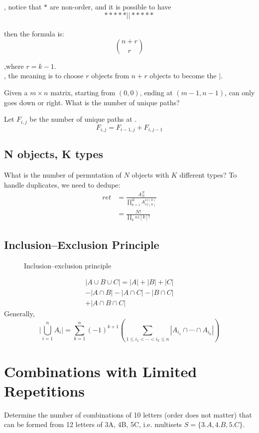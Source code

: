 , notice that $*$ are non-order, and it is possible to have 
$$
*****||*****
$$
\\
then the formula is:
$$
{n+r \choose r}
$$

,where $r=k-1$. 
\\
, the meaning is to choose $r$ objects from $n+r$ objects to become the $|$.

 Given a $m \times n$ matrix, starting from $(0, 0)$, ending at $(m-1, n-1)$, can only goes down or right. What is the number of unique paths?

Let $F_{i, j}$ be the number of unique paths at \pyinline{[i][j]}. 
$$
F_{i, j} = F_{i-1, j} + F_{i, j-1}
$$

\subsection{N objects, K types} \label{N_objects_K_types}
What is the number of permutation of $N$ objects with $K$ different types? To handle duplicates, we need to dedupe:
\begin{align*}
ret &= \frac{A_N^N}{\prod_{k=1}^K{A_{sz(k)}^{sz(k)}}} \\
&= \frac{N!}{\prod_{k} sz[k]!}
\end{align*}

\subsection{Inclusion–Exclusion Principle}
\begin{figure}[hbtp]
\centering
{}
\caption{Inclusion–exclusion principle}
\label{fig:500px-Inclusion-exclusion}
\end{figure}
\begin{eqnarray*}
|A \cup B \cup C| = |A| + |B| + |C| \\ - |A \cap B| - |A \cap C| - |B \cap C| \\ + |A \cap B \cap C|
\end{eqnarray*}
Generally,
$$
\Biggl|\bigcup_{i=1}^n A_i\Biggr| = \sum_{k = 1}^{n} (-1)^{k+1} \left( \sum_{1 \leq i_{1} < \cdots < i_{k} \leq n} \left| A_{i_{1}} \cap \cdots \cap A_{i_{k}} \right| \right)
$$
\section{Combinations with Limited Repetitions}
Determine the number of combinations of 10 letters (order does not matter) that can be formed from 12 letters of 3A, 4B, 5C, i.e. multisets $S=\{3.A, 4.B, 5.C\}$. 

